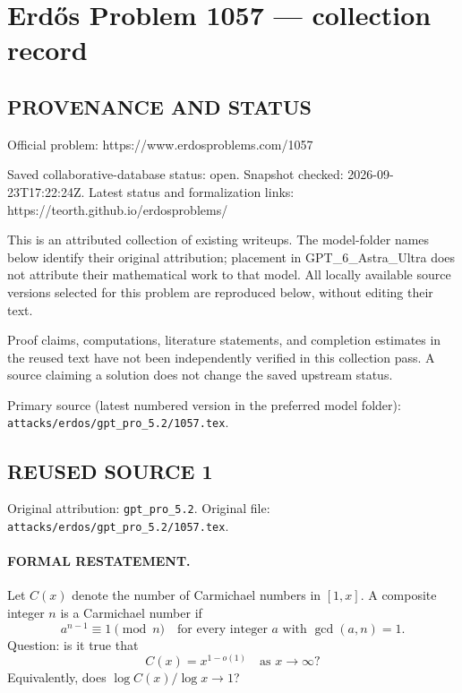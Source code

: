 \section*{Erd\H{o}s Problem 1057 --- collection record}

\subsection*{PROVENANCE AND STATUS}
Official problem: https://www.erdosproblems.com/1057

Saved collaborative-database status: open.
Snapshot checked: 2026-09-23T17:22:24Z.
Latest status and formalization links: https://teorth.github.io/erdosproblems/

This is an attributed collection of existing writeups. The model-folder names below identify their original attribution; placement in GPT\_6\_Astra\_Ultra does not attribute their mathematical work to that model. All locally available source versions selected for this problem are reproduced below, without editing their text.

Proof claims, computations, literature statements, and completion estimates in the reused text have not been independently verified in this collection pass. A source claiming a solution does not change the saved upstream status.

Primary source (latest numbered version in the preferred model folder): \texttt{attacks/erdos/gpt\_pro\_5.2/1057.tex}.

\subsection*{REUSED SOURCE 1}
Original attribution: \texttt{gpt\_pro\_5.2}.
Original file: \texttt{attacks/erdos/gpt\_pro\_5.2/1057.tex}.


\paragraph{FORMAL RESTATEMENT.}
Let $C(x)$ denote the number of Carmichael numbers in $[1,x]$.
A composite integer $n$ is a Carmichael number if
\[
a^{n-1}\equiv 1\pmod n\quad\text{for every integer }a\text{ with }\gcd(a,n)=1.
\]
Question: is it true that
\[
C(x)=x^{1-o(1)}\quad\text{as }x\to\infty?
\]
Equivalently, does $\log C(x)/\log x \to 1$?

